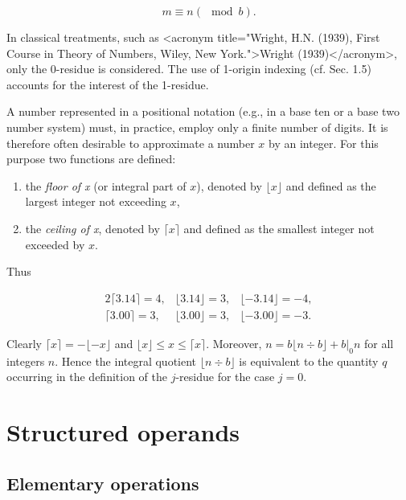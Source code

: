 $$
  m \equiv n (\mod b).
$$

\par In classical treatments, such as <acronym title="Wright, H.N. (1939), First Course in Theory of Numbers, Wiley, New York.">Wright (1939)</acronym>, only the 0-residue is considered. The use of 1-origin indexing (cf. Sec. 1.5) accounts for the interest of the 1-residue.

\par A number represented in a positional notation (e.g., in a base ten or a base two number system) must, in practice, employ only a finite number of digits. It is therefore often desirable to approximate a number $x$ by an integer. For this purpose two functions are defined:

\begin{enumerate}
  \item the \textit{floor of x} (or integral part of $x$), denoted by $⌊x⌋$ and defined as the largest integer not exceeding $x$,
  \item the \textit{ceiling of x}, denoted by $⌈x⌉$ and defined as the smallest integer not exceeded by $x$.
\end{enumerate}

\noindent Thus

\begin{alignat*}{2}
  ⌈3.14⌉ = 4, & ⌊3.14⌋ = 3, & ⌊-3.14⌋ = -4, \\
  ⌈3.00⌉ = 3, & ⌊3.00⌋ = 3, & ⌊-3.00⌋ = -3.
\end{alignat*}

\par Clearly $⌈x⌉ = -⌊-x⌋$ and $⌊x⌋ \leq x \leq ⌈x⌉$. Moreover, $n = b⌊n ÷ b⌋ + b |_0 n$ for all integers $n$. Hence the integral quotient $⌊n ÷ b⌋$ is equivalent to the quantity $q$ occurring in the definition of the $j$-residue for the case $j = 0$.

\section{Structured operands}

\subsection*{Elementary operations}

